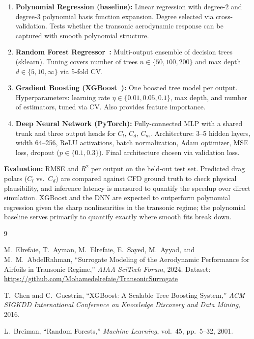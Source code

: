 \documentclass[11pt]{article}
\begin{document}
\begin{enumerate}[leftmargin=*, nosep]
  \item \textbf{Polynomial Regression (baseline):} Linear regression
  with degree-2 and degree-3 polynomial basis function expansion.
  Degree selected via cross-validation. Tests whether the transonic
  aerodynamic response can be captured with smooth polynomial structure.

  \item \textbf{Random Forest Regressor~\cite{breiman2001}:}
  Multi-output ensemble of decision trees (sklearn). Tuning covers
  number of trees $n \in \{50, 100, 200\}$ and max depth
  $d \in \{5, 10, \infty\}$ via 5-fold CV.

  \item \textbf{Gradient Boosting (XGBoost~\cite{chen2016}):} One
  boosted tree model per output. Hyperparameters: learning rate
  $\eta \in \{0.01, 0.05, 0.1\}$, max depth, and number of estimators,
  tuned via CV. Also provides feature importance.

  \item \textbf{Deep Neural Network (PyTorch):} Fully-connected MLP
  with a shared trunk and three output heads for $C_l$, $C_d$, $C_m$.
  Architecture: 3--5 hidden layers, width 64--256, ReLU activations,
  batch normalization, Adam optimizer, MSE loss, dropout
  ($p \in \{0.1, 0.3\}$). Final architecture chosen via validation
  loss.
\end{enumerate}

\textbf{Evaluation:} RMSE and $R^2$ per output on the held-out test
set. Predicted drag polars ($C_l$ vs.\ $C_d$) are compared against
CFD ground truth to check physical plausibility, and inference latency
is measured to quantify the speedup over direct simulation.
XGBoost and the DNN are expected to outperform polynomial regression
given the sharp nonlinearities in the transonic regime; the polynomial
baseline serves primarily to quantify exactly where smooth fits break
down.

\begin{thebibliography}{9}

M.~Elrefaie, T.~Ayman, M.~Elrefaie, E.~Sayed, M.~Ayyad, and M.~M.~AbdelRahman,
``Surrogate Modeling of the Aerodynamic Performance for Airfoils in Transonic Regime,''
\textit{AIAA SciTech Forum}, 2024.
Dataset: \url{https://github.com/Mohamedelrefaie/TransonicSurrogate}

T.~Chen and C.~Guestrin,
``XGBoost: A Scalable Tree Boosting System,''
\textit{ACM SIGKDD International Conference on Knowledge Discovery
and Data Mining}, 2016.

L.~Breiman,
``Random Forests,''
\textit{Machine Learning}, vol.~45, pp.~5--32, 2001.

\end{thebibliography}
\end{document}
